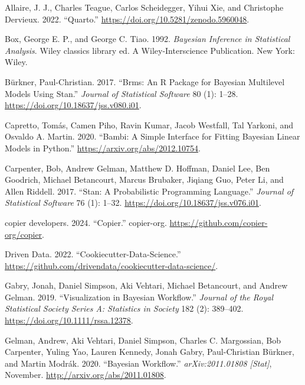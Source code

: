 \documentclass[
  letterpaper,
  DIV=11,
  numbers=noendperiod]{scrartcl}
\newlength{\cslhangindent}
\newenvironment{CSLReferences}[2] %
 {\begin{list}{}{%
  \setlength{\itemindent}{0pt}
  \setlength{\leftmargin}{0pt}
  \setlength{\parsep}{0pt}
  \ifodd #1
   \setlength{\leftmargin}{\cslhangindent}
   \setlength{\itemindent}{-1\cslhangindent}
  \fi
  \setlength{\itemsep}{#2\baselineskip}}}
 {\end{list}}
\begin{document}
\label{refs}
\begin{CSLReferences}{1}{0}
Allaire, J. J., Charles Teague, Carlos Scheidegger, Yihui Xie, and
Christophe Dervieux. 2022. {``Quarto.''}
\url{https://doi.org/10.5281/zenodo.5960048}.

Box, George E. P., and George C. Tiao. 1992. \emph{Bayesian Inference in
Statistical Analysis}. Wiley classics library ed. A {Wiley-Interscience}
Publication. {New York}: {Wiley}.

Bürkner, Paul-Christian. 2017. {``Brms: {An R} Package for {Bayesian}
Multilevel Models Using {Stan}.''} \emph{Journal of Statistical
Software} 80 (1): 1--28. \url{https://doi.org/10.18637/jss.v080.i01}.

Capretto, Tomás, Camen Piho, Ravin Kumar, Jacob Westfall, Tal Yarkoni,
and Osvaldo A. Martin. 2020. {``Bambi: {A} Simple Interface for Fitting
{Bayesian} Linear Models in {Python}.''}
\url{https://arxiv.org/abs/2012.10754}.

Carpenter, Bob, Andrew Gelman, Matthew D. Hoffman, Daniel Lee, Ben
Goodrich, Michael Betancourt, Marcus Brubaker, Jiqiang Guo, Peter Li,
and Allen Riddell. 2017. {``Stan: {A Probabilistic Programming
Language}.''} \emph{Journal of Statistical Software} 76 (1): 1--32.
\url{https://doi.org/10.18637/jss.v076.i01}.

copier developers. 2024. {``Copier.''} copier-org.
\url{https://github.com/copier-org/copier}.

Driven Data. 2022. {``Cookiecutter-Data-Science.''}
\url{https://github.com/drivendata/cookiecutter-data-science/}.

Gabry, Jonah, Daniel Simpson, Aki Vehtari, Michael Betancourt, and
Andrew Gelman. 2019. {``Visualization in {Bayesian Workflow}.''}
\emph{Journal of the Royal Statistical Society Series A: Statistics in
Society} 182 (2): 389--402. \url{https://doi.org/10.1111/rssa.12378}.

Gelman, Andrew, Aki Vehtari, Daniel Simpson, Charles C. Margossian, Bob
Carpenter, Yuling Yao, Lauren Kennedy, Jonah Gabry, Paul-Christian
Bürkner, and Martin Modrák. 2020. {``Bayesian {Workflow}.''}
\emph{arXiv:2011.01808 {[}Stat{]}}, November.
\url{http://arxiv.org/abs/2011.01808}.


\end{CSLReferences}
\end{document}
